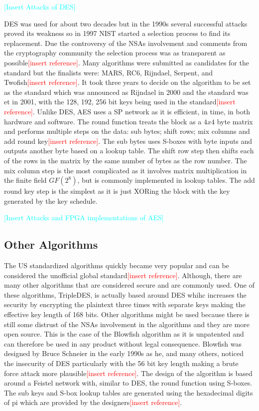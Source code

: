 \documentclass[12pt,twoside,a4paper]{report}
\begin{document}
    \textcolor{cyan}{[Insert Attacks of DES]}
    
    DES was used for about two decades but in the 1990s several successful attacks proved its weakness so in 1997 NIST started a selection process to find its replacement. Due the controversy of the NSAs involvement and comments from the cryptography community the selection process was as transparent as possible\textcolor{red}{[insert reference]}. Many algorithms were submitted as candidates for the standard but the finalists were: MARS, RC6, Rijndael, Serpent, and Twofish\textcolor{red}{[insert reference]}. It took three years to decide on the algorithm to be set as the standard which was announced as Rijndael in 2000 and the standard was et in 2001, with the 128, 192, 256 bit keys being used in the standard\textcolor{red}{[insert reference]}. Unlike DES, AES uses a SP network as it is efficient, in time, in both hardware and software. The round function treats the block as a $4x4$ byte matrix and performs multiple steps on the data: sub bytes; shift rows; mix columns and add round key\textcolor{red}{[insert reference]}. The sub bytes uses S-boxes with byte inputs and outputs another byte based on a lookup table. The shift row step then shifts each of the rows in the matrix by the same number of bytes as the row number. The mix column step is the most complicated as it involves matrix multiplication in the finite field $GF(2^8)$, but is commonly implemented in lookup tables. The add round key step is the simplest as it is just XORing the block with the key generated by the key schedule.
    
    \textcolor{cyan}{[Insert Attacks and FPGA implementations of AES]}
    
    \subsection{Other Algorithms}
    The US standardized algorithms quickly became very popular and can be considered the unofficial global standard\textcolor{red}{[insert reference]}. Although, there are many other algorithms that are considered secure and are commonly used. One of these algorithms, TripleDES, is actually based around DES whihc increases the security by encrypting the plaintext three times with separate keys making the effective key length of 168 bits. Other algorithms might be used because there is still some distrust of the NSAs involvement in the algorithms and they are more open source. This is the case of the Blowfish algorithm as it is unpatented and can therefore be used in any product without legal consequence. Blowfish was designed by Bruce Schneier in the early 1990s as he, and many others, noticed the insecurity of DES particularly with the 56 bit key length making a brute force attack more plausible\textcolor{red}{[insert reference]}. The design of the algorithm is based around a Feistel network with, similar to DES, the round function using S-boxes. The sub keys and S-box lookup tables are generated using the hexadecimal digits of pi which are provided by the designers\textcolor{red}{[insert reference]}.
    
\end{document}

